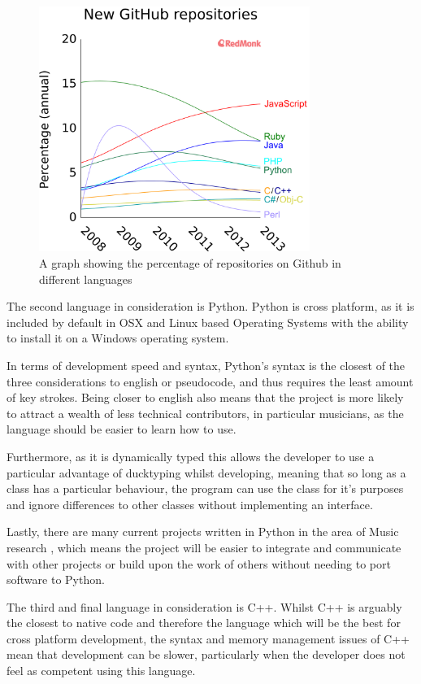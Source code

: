 \begin{figure}[h]
\centering
\includegraphics[width=250pt]{github-repos}
\caption{A graph showing the percentage of repositories on Github in different languages}	
\label{fig:graph}
\end{figure}

The second language in consideration is Python. Python is cross platform, as it is included by default in OSX and Linux based Operating Systems with the ability to install it on a Windows operating system.

In terms of development speed and syntax, Python's syntax is the closest of the three considerations to english or pseudocode, and thus requires the least amount of key strokes. Being closer to english also means that the project is more likely to attract a wealth of less technical contributors, in particular musicians, as the language should be easier to learn how to use.

 Furthermore, as it is dynamically typed this allows the developer to use a particular advantage of ducktyping whilst developing, meaning that so long as a class has a particular behaviour, the program can use the class for it's purposes and ignore differences to other classes without implementing an interface.
 
 Lastly, there are many current projects written in Python in the area of Music research \parencite{pmus}, which means the project will be easier to integrate and communicate with other projects or build upon the work of others without needing to port software to Python.

The third and final language in consideration is C++. Whilst C++ is arguably the closest to native code and therefore the language which will be the best for cross platform development, the syntax and memory management issues of C++ mean that development can be slower, particularly when the developer does not feel as competent using this language.


